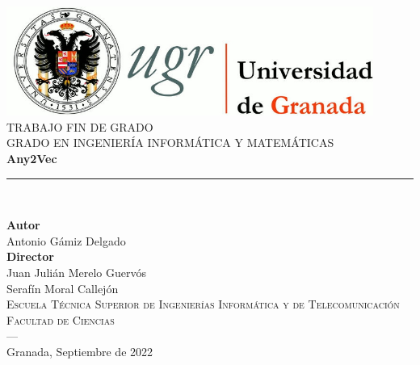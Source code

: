 \begin{titlepage}
\newlength{\centeroffset}
\setlength{\centeroffset}{-0.5\oddsidemargin}
\addtolength{\centeroffset}{0.5\evensidemargin}
\thispagestyle{empty}

\noindent\hspace*{\centeroffset}\begin{minipage}{\textwidth}

\centering
\includegraphics[width=0.9\textwidth]{logos/logo_ugr.jpg}\\[1.4cm]

\textsc{ \Large TRABAJO FIN DE GRADO\\[0.2cm]}
\textsc{ GRADO EN INGENIERÍA INFORMÁTICA Y MATEMÁTICAS}\\[1cm]

{\Huge\bfseries Any2Vec \\}
\noindent\rule[-1ex]{\textwidth}{3pt}\\[3.5ex]
{\large\bfseries }
\end{minipage}

\vspace{2.5cm}
\noindent\hspace*{\centeroffset}
\begin{minipage}{\textwidth}
\centering

\textbf{Autor}\\ {Antonio Gámiz Delgado}\\[2.5ex]
\textbf{Director}\\ {Juan Julián Merelo Guervós \\ Serafín Moral Callejón }\\[2cm]
\textsc{Escuela Técnica Superior de Ingenierías Informática y de Telecomunicación}\\
\textsc{Facultad de Ciencias}\\
\textsc{---}\\
Granada, Septiembre de 2022
\end{minipage}
\end{titlepage}
